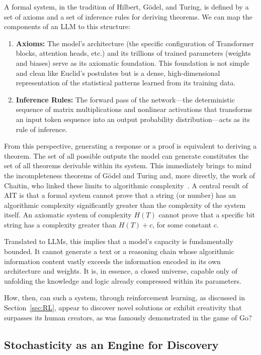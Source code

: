 \documentclass[%
  reprint,
  superscriptaddress,
  showpacs,
  showkeys,
  amsmath,amssymb,
  pra,
  longbibliography,
  floatfix,
  x11names
]{revtex4-2}
\begin{document}
A formal system, in the tradition of Hilbert, G\"odel, and Turing, is defined by a set of axioms and a set of inference rules for deriving theorems.
We can map the components of an LLM to this structure:
\begin{enumerate}
    \item \textbf{Axioms:} The model's architecture (the specific configuration of Transformer blocks, attention heads, etc.) and its trillions of trained parameters (weights and biases) serve as its axiomatic foundation. This foundation is not simple and clean like Euclid's postulates but is a dense, high-dimensional representation of the statistical patterns learned from its training data.
    \item \textbf{Inference Rules:} The forward pass of the network---the deterministic sequence of matrix multiplications and nonlinear activations that transforms an input token sequence into an output probability distribution---acts as its rule of inference.
\end{enumerate}

From this perspective, generating a response or a proof is equivalent to deriving a theorem.
The set of all possible outputs the model can generate constitutes the set of all theorems
derivable within its system.
This immediately brings to mind the incompleteness theorems of G\"odel and Turing and,
 more directly, the work of Chaitin,
who linked these limits to algorithmic complexity~\cite{chaitin-ACM,Chaitin199283,chaitin2}.
A central result of AIT is that a formal system cannot prove that a string (or number)
has an algorithmic complexity significantly greater than the complexity of the system itself.
An axiomatic system of complexity $H(T)$ cannot prove that a specific bit string
has a complexity greater than $H(T)+c$, for some constant $c$.

Translated to LLMs, this implies that a model's capacity is fundamentally bounded.
It cannot generate a text or a reasoning chain whose algorithmic information content
vastly exceeds the information encoded in its own architecture and weights.
It is, in essence, a closed universe, capable only of unfolding the knowledge and logic
already compressed within its parameters.

How, then, can such a system, through reinforcement learning, as discussed in Section~\ref{sec:RL},
appear to discover novel solutions or exhibit creativity that surpasses
its human creators, as was famously demonstrated in the game of Go?

\subsection{Stochasticity as an Engine for Discovery}
\end{document}
